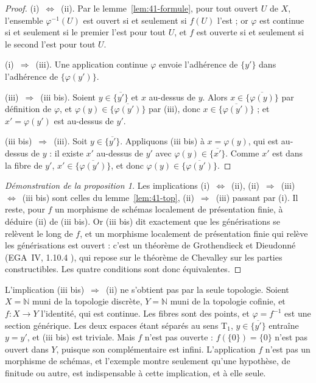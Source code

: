 \begin{proof}
(i)~$\Leftrightarrow$~(ii). Par le lemme~\ref{lem:41-formule}, pour tout ouvert $U$ de $X$, l'ensemble $\varphi^{-1}(U)$ est ouvert si et seulement si $f(U)$ l'est ; or $\varphi$ est continue si et seulement si le premier l'est pour tout $U$, et $f$ est ouverte si et seulement si le second l'est pour tout $U$.

(i)~$\Rightarrow$~(iii). Une application continue $\varphi$ envoie l'adhérence de $\{y'\}$ dans l'adhérence de $\{\varphi(y')\}$.

(iii)~$\Rightarrow$~(iii bis). Soient $y \in \overline{\{y'\}}$ et $x$ au-dessus de $y$. Alors $x \in \overline{\{\varphi(y)\}}$ par définition de $\varphi$, et $\varphi(y) \in \overline{\{\varphi(y')\}}$ par (iii), donc $x \in \overline{\{\varphi(y')\}}$ ; et $x' = \varphi(y')$ est au-dessus de $y'$.

(iii bis)~$\Rightarrow$~(iii). Soit $y \in \overline{\{y'\}}$. Appliquons (iii bis) à $x = \varphi(y)$, qui est au-dessus de $y$ : il existe $x'$ au-dessus de $y'$ avec $\varphi(y) \in \overline{\{x'\}}$. Comme $x'$ est dans la fibre de $y'$, $x' \in \overline{\{\varphi(y')\}}$, et donc $\varphi(y) \in \overline{\{\varphi(y')\}}$.
\end{proof}

\begin{proof}[Démonstration de la proposition 1]
Les implications (i)~$\Leftrightarrow$~(ii), (ii)~$\Rightarrow$~(iii)~$\Leftrightarrow$~(iii bis) sont celles du lemme~\ref{lem:41-top}, (ii)~$\Rightarrow$~(iii) passant par (i). Il reste, pour $f$ un morphisme de schémas localement de présentation finie, à déduire (ii) de (iii bis). Or (iii bis) dit exactement que les générisations se relèvent le long de $f$, et un morphisme localement de présentation finie qui relève les générisations est ouvert : c'est un théorème de Grothendieck et Dieudonné (EGA~IV, 1.10.4 \cite{ega4-1}), qui repose sur le théorème de Chevalley sur les parties constructibles. Les quatre conditions sont donc équivalentes.
\end{proof}

\begin{remarque}
L'implication (iii bis)~$\Rightarrow$~(ii) ne s'obtient pas par la seule topologie. Soient $X = \mathbb N$ muni de la topologie discrète, $Y = \mathbb N$ muni de la topologie cofinie, et $f : X \to Y$ l'identité, qui est continue. Les fibres sont des points, et $\varphi = f^{-1}$ est une section générique. Les deux espaces étant séparés au sens T$_1$, $y \in \overline{\{y'\}}$ entraîne $y = y'$, et (iii bis) est triviale. Mais $f$ n'est pas ouverte : $f(\{0\}) = \{0\}$ n'est pas ouvert dans $Y$, puisque son complémentaire est infini. L'application $f$ n'est pas un morphisme de schémas, et l'exemple montre seulement qu'une hypothèse, de finitude ou autre, est indispensable à cette implication, et à elle seule.
\end{remarque}

